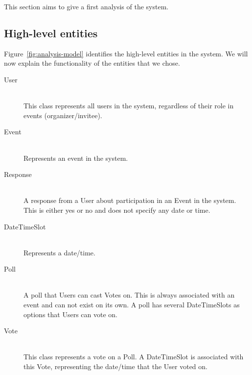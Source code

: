 This section aims to give a first analysis of the system.

\subsection{High-level entities}
	\label{sec:analysisdiagram}
	Figure~\ref{fig:analysis-model} identifies the high-level entities in the system. We will now explain the functionality of the entities that we chose.

	\begin{description}
		\item[User] \hfill \\
			This class represents all users in the system, regardless of their role in events (organizer/invitee).
		\item[Event] \hfill \\
			Represents an event in the system.
		\item[Response] \hfill \\
			A response from a User about participation in an Event in the system. This is either yes or no and does not specify any date or time.
		\item[DateTimeSlot] \hfill \\
			Represents a date/time.
		\item[Poll] \hfill \\
			A poll that Users can cast Votes on. This is always associated with an event and can not exist on its own. A poll has several DateTimeSlots as options that Users can vote on.
		\item[Vote] \hfill \\
			This class represents a vote on a Poll. A DateTimeSlot is associated with this Vote, representing the date/time that the User voted on.
			
	\end{description}
	
